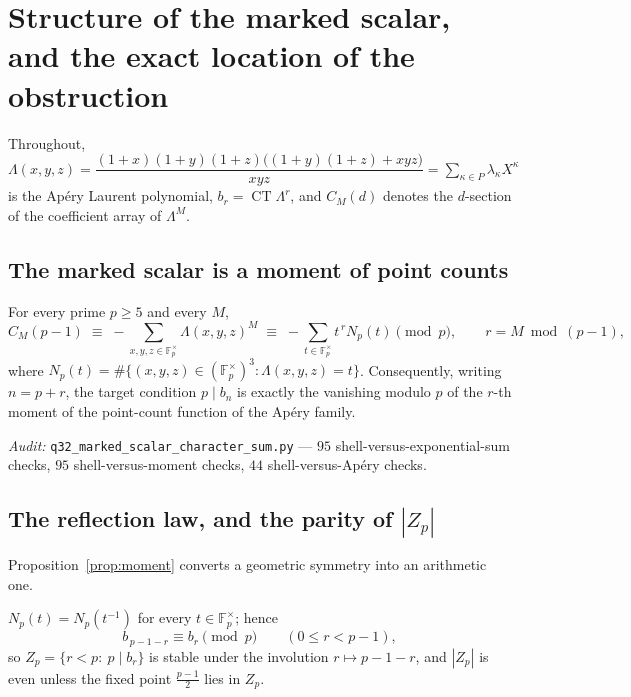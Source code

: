 
\section{Structure of the marked scalar, and the exact location of the obstruction}
\label{sec:marked-scalar-structure}

Throughout, $\Lambda(x,y,z)=\dfrac{(1+x)(1+y)(1+z)\bigl((1+y)(1+z)+xyz\bigr)}{xyz}
=\sum_{\kappa\in P}\lambda_\kappa X^\kappa$ is the Ap\'ery Laurent polynomial,
$b_r=\operatorname{CT}\Lambda^r$, and $C_M(d)$ denotes the $d$-section of the coefficient
array of $\Lambda^M$.

\subsection{The marked scalar is a moment of point counts}

\begin{proposition}\label{prop:moment}
For every prime $p\ge5$ and every $M$,
\[
  C_M(p-1)\;\equiv\;-\sum_{x,y,z\in\mathbb F_p^\times}\Lambda(x,y,z)^M
  \;\equiv\;-\sum_{t\in\mathbb F_p^\times}t^{\,r}N_p(t)\pmod p,
  \qquad r=M\bmod(p-1),
\]
where $N_p(t)=\#\{(x,y,z)\in(\mathbb F_p^\times)^3:\Lambda(x,y,z)=t\}$.
Consequently, writing $n=p+r$, the target condition $p\mid b_n$ is exactly the vanishing
modulo $p$ of the $r$-th moment of the point-count function of the Ap\'ery family.
\end{proposition}

\noindent
\emph{Audit:} \texttt{q32\_marked\_scalar\_character\_sum.py} — $95$ shell-versus-exponential-sum
checks, $95$ shell-versus-moment checks, $44$ shell-versus-Ap\'ery checks.

\subsection{The reflection law, and the parity of $|Z_p|$}

Proposition~\ref{prop:moment} converts a geometric symmetry into an arithmetic one.

\begin{proposition}\label{prop:palindrome}
$N_p(t)=N_p(t^{-1})$ for every $t\in\mathbb F_p^\times$; hence
\[
  b_{\,p-1-r}\equiv b_r\pmod p\qquad(0\le r<p-1),
\]
so $Z_p=\{r<p:\ p\mid b_r\}$ is stable under the involution $r\mapsto p-1-r$, and
$|Z_p|$ is even unless the fixed point $\tfrac{p-1}2$ lies in $Z_p$.
\end{proposition}

